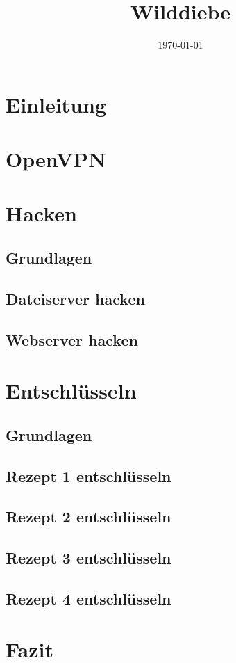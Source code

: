\documentclass{scrartcl}
\title{Wilddiebe}
\date{\today}
\begin{document}
\maketitle{}
\tableofcontents

\section{Einleitung}


\section{OpenVPN}


\section{Hacken}

\subsection{Grundlagen} %

\subsection{Dateiserver hacken} %

\subsection{Webserver hacken} %


\section{Entschlüsseln}

\subsection{Grundlagen}

\subsection{Rezept 1 entschlüsseln} %

\subsection{Rezept 2 entschlüsseln} %

\subsection{Rezept 3 entschlüsseln}

\subsection{Rezept 4 entschlüsseln}


\section{Fazit}

\end{document}
